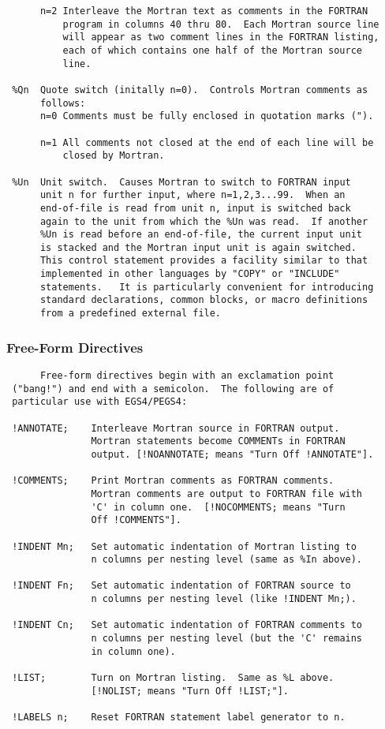 \begin{verbatim}
      n=2 Interleave the Mortran text as comments in the FORTRAN
          program in columns 40 thru 80.  Each Mortran source line
          will appear as two comment lines in the FORTRAN listing,
          each of which contains one half of the Mortran source
          line.

 %Qn  Quote switch (initally n=0).  Controls Mortran comments as
      follows:
      n=0 Comments must be fully enclosed in quotation marks (").

      n=1 All comments not closed at the end of each line will be
          closed by Mortran.

 %Un  Unit switch.  Causes Mortran to switch to FORTRAN input
      unit n for further input, where n=1,2,3...99.  When an
      end-of-file is read from unit n, input is switched back
      again to the unit from which the %Un was read.  If another
      %Un is read before an end-of-file, the current input unit
      is stacked and the Mortran input unit is again switched.
      This control statement provides a facility similar to that
      implemented in other languages by "COPY" or "INCLUDE"
      statements.   It is particularly convenient for introducing
      standard declarations, common blocks, or macro definitions
      from a predefined external file.
 \end{verbatim}
 \subsubsection{Free-Form Directives}
 \begin{verbatim}
      Free-form directives begin with an exclamation point
 ("bang!") and end with a semicolon.  The following are of
 particular use with EGS4/PEGS4:

 !ANNOTATE;    Interleave Mortran source in FORTRAN output.
               Mortran statements become COMMENTs in FORTRAN
               output. [!NOANNOTATE; means "Turn Off !ANNOTATE"].

 !COMMENTS;    Print Mortran comments as FORTRAN comments.
               Mortran comments are output to FORTRAN file with
               'C' in column one.  [!NOCOMMENTS; means "Turn
               Off !COMMENTS"].

 !INDENT Mn;   Set automatic indentation of Mortran listing to
               n columns per nesting level (same as %In above).

 !INDENT Fn;   Set automatic indentation of FORTRAN source to
               n columns per nesting level (like !INDENT Mn;).

 !INDENT Cn;   Set automatic indentation of FORTRAN comments to
               n columns per nesting level (but the 'C' remains
               in column one).

 !LIST;        Turn on Mortran listing.  Same as %L above.
               [!NOLIST; means "Turn Off !LIST;"].

 !LABELS n;    Reset FORTRAN statement label generator to n.
\end{verbatim}
